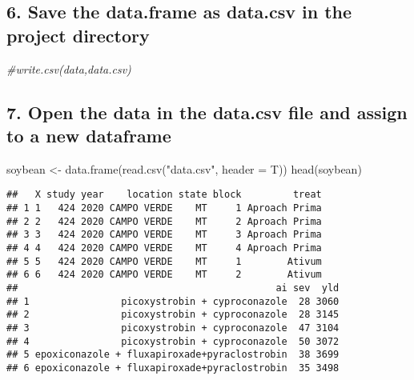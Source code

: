 \documentclass[
]{article}
\newenvironment{Shaded}{\begin{snugshade}}{\end{snugshade}}
\newcommand{\AttributeTok}[1]{\textcolor[rgb]{0.77,0.63,0.00}{#1}}
\newcommand{\CommentTok}[1]{\textcolor[rgb]{0.56,0.35,0.01}{\textit{#1}}}
\newcommand{\FunctionTok}[1]{\textcolor[rgb]{0.00,0.00,0.00}{#1}}
\newcommand{\NormalTok}[1]{#1}
\newcommand{\OtherTok}[1]{\textcolor[rgb]{0.56,0.35,0.01}{#1}}
\newcommand{\StringTok}[1]{\textcolor[rgb]{0.31,0.60,0.02}{#1}}
\begin{document}
\hypertarget{save-the-data.frame-as-data.csv-in-the-project-directory}{%
\subsection{6. Save the data.frame as data.csv in the project
directory}\label{save-the-data.frame-as-data.csv-in-the-project-directory}}

\begin{Shaded}
\begin{Highlighting}[]
\CommentTok{\#write.csv(data,\textquotesingle{}data.csv\textquotesingle{})}
\end{Highlighting}
\end{Shaded}

\hypertarget{open-the-data-in-the-data.csv-file-and-assign-to-a-new-dataframe}{%
\subsection{7. Open the data in the data.csv file and assign to a new
dataframe}\label{open-the-data-in-the-data.csv-file-and-assign-to-a-new-dataframe}}

\begin{Shaded}
\begin{Highlighting}[]
\NormalTok{soybean }\OtherTok{\textless{}{-}} \FunctionTok{data.frame}\NormalTok{(}\FunctionTok{read.csv}\NormalTok{(}\StringTok{"data.csv"}\NormalTok{, }\AttributeTok{header =}\NormalTok{ T))}
\FunctionTok{head}\NormalTok{(soybean)}
\end{Highlighting}
\end{Shaded}

\begin{verbatim}
##   X study year    location state block         treat
## 1 1   424 2020 CAMPO VERDE    MT     1 Aproach Prima
## 2 2   424 2020 CAMPO VERDE    MT     2 Aproach Prima
## 3 3   424 2020 CAMPO VERDE    MT     3 Aproach Prima
## 4 4   424 2020 CAMPO VERDE    MT     4 Aproach Prima
## 5 5   424 2020 CAMPO VERDE    MT     1        Ativum
## 6 6   424 2020 CAMPO VERDE    MT     2        Ativum
##                                             ai sev  yld
## 1                picoxystrobin + cyproconazole  28 3060
## 2                picoxystrobin + cyproconazole  28 3145
## 3                picoxystrobin + cyproconazole  47 3104
## 4                picoxystrobin + cyproconazole  50 3072
## 5 epoxiconazole + fluxapiroxade+pyraclostrobin  38 3699
## 6 epoxiconazole + fluxapiroxade+pyraclostrobin  35 3498
\end{verbatim}
\end{document}

